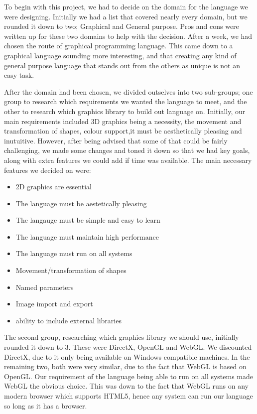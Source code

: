 \documentclass{l3proj}
\begin{document}
To begin with this project, we had to decide on the domain for the language we were designing. Initially we had a list that covered nearly every domain, but we rounded it down to two; Graphical and General purpose. Pros and cons were written up for these two domains to help with the decision. After a week, we had chosen the route of graphical programming language. This came down to a graphical language sounding more interesting, and that creating any kind of general purpose language that stands out from the others as unique is not an easy task.

After the domain had been chosen, we divided outselves into two sub-groups; one group to research which requirements we wanted the language to meet, and the other to research which graphics library to build out language on. Initially, our main requirements included 3D graphics being a necessity, the movement and transformation of shapes, colour support,it must be aesthetically pleasing and inutuitive. However, after being advised that some of that could be fairly challenging, we made some changes and toned it down so that we had key goals, along with extra features we could add if time was available. The main necessary features we decided on were:
\begin{itemize}
\item 2D graphics are essential
\item The language must be aestetically pleasing
\item The langauge must be simple and easy to learn
\item The language must maintain high performance
\item The language must run on all systems
\item Movement/transformation of shapes
\item Named parameters
\item Image import and export
\item ability to include external libraries
\end{itemize}
The second group, researching which graphics library we should use, initially rounded it down to 3. These were DirectX, OpenGL and WebGL. We discounted DirectX, due to it only being available on Windows compatible machines. In the remaining two, both were very similar, due to the fact that WebGL is based on OpenGL. Our requirement of the language being able to run on all systems made WebGL the obvious choice. This was down to the fact that WebGL runs on any modern browser which supports HTML5, hence any system can run our language so long as it has a browser.
\end{document}
